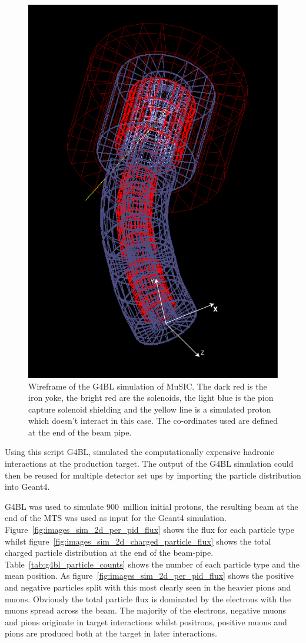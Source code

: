 \begin{figure}[hptb]
  \centering
    \includegraphics[width=.75\textwidth]{images/Geometry/g4bl_wireframe.png}
  \caption{Wireframe of the G4BL simulation of MuSIC. The dark red is the iron yoke, the bright red are the solenoids, the light blue is the pion capture solenoid shielding and the yellow line is a simulated proton which doesn't interact in this case. The co-ordinates used are defined at the end of the beam pipe.}
  \label{fig:images_Geometry_g4bl_wireframe}
\end{figure}

Using this script G4BL, simulated the computationally expensive hadronic interactions at the production target. The output of the G4BL simulation could then be reused for multiple detector set ups by importing the particle distribution into Geant4.

G4BL was used to simulate 900~million initial protons, the resulting beam at the end of the MTS was used as input for the Geant4 simulation. Figure~\ref{fig:images_sim_2d_per_pid_flux} shows the flux for each particle type whilst figure~\ref{fig:images_sim_2d_charged_particle_flux} shows the total charged particle distribution at the end of the beam-pipe. Table~\ref{tab:g4bl_particle_counts} shows the number of each particle type and the mean position. As figure~\ref{fig:images_sim_2d_per_pid_flux} shows the positive and negative particles split with this most clearly seen in the heavier pions and muons. Obviously the total particle flux is dominated by the electrons with the muons spread across the beam. The majority of the electrons, negative muons and pions originate in target interactions whilst positrons, positive muons and pions are produced both at the target in later interactions.

